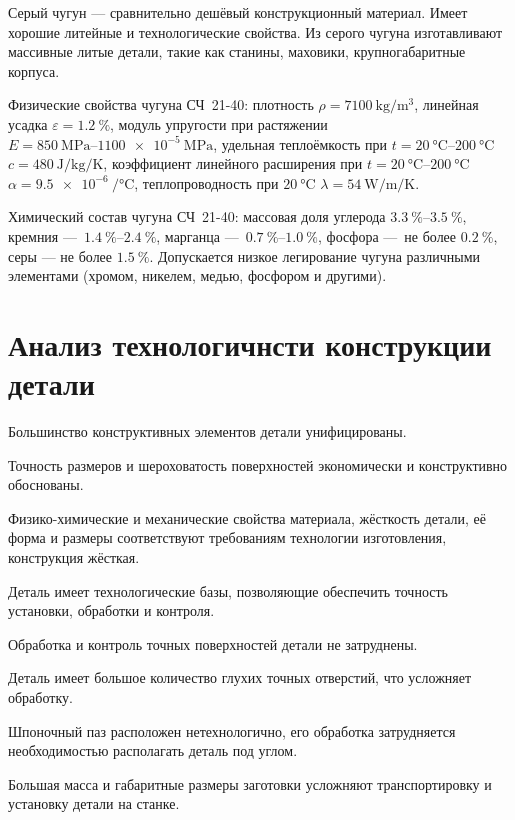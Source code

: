 \documentclass[14pt,russian,a4paper]{extreport}
\begin{document}
Серый чугун --- сравнительно дешёвый конструкционный материал. Имеет хорошие литейные и технологические свойства. Из серого чугуна изготавливают массивные литые детали, такие как станины, маховики, крупногабаритные корпуса. \par

Физические свойства чугуна СЧ~21-40: плотность $\rho = \SI{7100}{\kilo\gram\per\meter\cubed}$, линейная усадка $\varepsilon = \SI{1,2}{\percent}$, модуль упругости при растяжении $E = \SIrange[allow-number-unit-breaks]{850}{1100e-5}{\mega\pascal}$, удельная теплоёмкость при $t = \SIrange{20}{200}{\celsius}$ $c = \SI{480}{\joule\per\kilo\gram\per\kelvin}$, коэффициент линейного расширения при $t = \SIrange{20}{200}{\celsius}$ $\alpha = \SI[per-mode=reciprocal]{9,5e-6}{\per\celsius}$, теплопроводность при $\SI{20}{\celsius}$ $\lambda = \SI{54}{\watt\per\meter\per\kelvin}$. \par

Химический состав чугуна СЧ~21-40: массовая доля углерода $\SIrange{3,3}{3,5}{\percent}$, кремния --- $\SIrange{1,4}{2,4}{\percent}$, марганца --- $\SIrange{0,7}{1,0}{\percent}$, фосфора --- не более $\SI{0,2}{\percent}$, серы --- не более $\SI{1,5}{\percent}$. Допускается низкое легирование чугуна различными элементами (хромом, никелем, медью, фосфором и другими).


\section{Анализ технологичнсти конструкции детали}

Большинство конструктивных элементов детали унифицированы. 

Точность размеров и шероховатость поверхностей экономически и конструктивно обоснованы. 

Физико-химические и механические свойства материала, жёсткость детали, её форма и размеры соответствуют требованиям технологии изготовления, конструкция жёсткая.

Деталь имеет технологические базы, позволяющие обеспечить точность установки, обработки и контроля.

Обработка и контроль точных поверхностей детали не затруднены.

Деталь имеет большое количество глухих точных отверстий, что усложняет обработку.

Шпоночный паз расположен нетехнологично, его обработка затрудняется необходимостью располагать деталь под углом.

Большая масса и габаритные размеры заготовки усложняют транспортировку и установку детали на станке.
\end{document}
